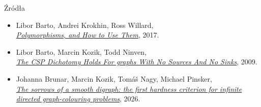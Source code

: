 \begin{frame}{Źródła}

    \begin{itemize}
        \item Libor Barto, Andrei Krokhin, Ross Willard,\\
        \href{https://drops.dagstuhl.de/storage/02dagstuhl-follow-ups/dfu-vol007/DFU.Vol7.15301.1/DFU.Vol7.15301.1.pdf}{\textit{Polymorphisms, and How to Use Them}}, 2017.
        \item Libor Barto, Marcin Kozik, Todd Ninven,\\
        \href{https://www.karlin.mff.cuni.cz/~barto/Articles/CSPSmooth.pdf}{\textit{The CSP Dichotomy Holds For graphs With No Sources And No Sinks}}, 2009.
        \item Johanna Brunar, Marcin Kozik, Tom\'{a}\v{s} Nagy, Michael Pinsker,\\
        \href{https://arxiv.org/pdf/2501.17060}{\textit{The sorrows of a smooth digraph: the first hardness criterion for infinite directed graph-colouring problems}}, 2026.
    \end{itemize}

\end{frame}